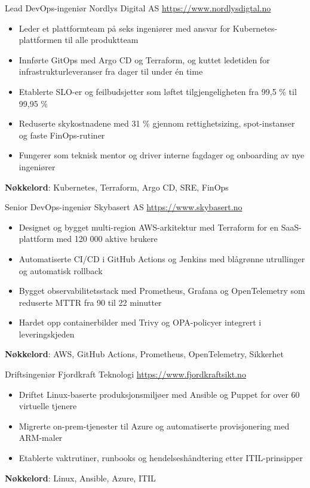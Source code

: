 \documentclass[a4paper, serif, 10pt]{moderncv}
\begin{document}
        {Lead DevOps-ingeniør}
        {Nordlys Digital AS}
        {\url{https://www.nordlysdigtal.no}}
        {}
        {\begin{itemize}
\item Leder et plattformteam på seks ingeniører med ansvar for Kubernetes-plattformen til alle produktteam
\item Innførte GitOps med Argo CD og Terraform, og kuttet ledetiden for infrastrukturleveranser fra dager til under én time
\item Etablerte SLO-er og feilbudsjetter som løftet tilgjengeligheten fra 99,5 \% til 99,95 \%
\item Reduserte skykostnadene med 31 \% gjennom rettighetsizing, spot-instanser og faste FinOps-rutiner
\item Fungerer som teknisk mentor og driver interne fagdager og onboarding av nye ingeniører
\end{itemize}
\textbf{Nøkkelord}: Kubernetes, Terraform, Argo CD, SRE, FinOps}

        {Senior DevOps-ingeniør}
        {Skybasert AS}
        {\url{https://www.skybasert.no}}
        {}
        {\begin{itemize}
\item Designet og bygget multi-region AWS-arkitektur med Terraform for en SaaS-plattform med 120 000 aktive brukere
\item Automatiserte CI/CD i GitHub Actions og Jenkins med blågrønne utrullinger og automatisk rollback
\item Bygget observabilitetsstack med Prometheus, Grafana og OpenTelemetry som reduserte MTTR fra 90 til 22 minutter
\item Hardet opp containerbilder med Trivy og OPA-policyer integrert i leveringskjeden
\end{itemize}
\textbf{Nøkkelord}: AWS, GitHub Actions, Prometheus, OpenTelemetry, Sikkerhet}

        {Driftsingeniør}
        {Fjordkraft Teknologi}
        {\url{https://www.fjordkraftsikt.no}}
        {}
        {\begin{itemize}
\item Driftet Linux-baserte produksjonsmiljøer med Ansible og Puppet for over 60 virtuelle tjenere
\item Migrerte on-prem-tjenester til Azure og automatiserte provisjonering med ARM-maler
\item Etablerte vaktrutiner, runbooks og hendelseshåndtering etter ITIL-prinsipper
\end{itemize}
\textbf{Nøkkelord}: Linux, Ansible, Azure, ITIL}
\end{document}
